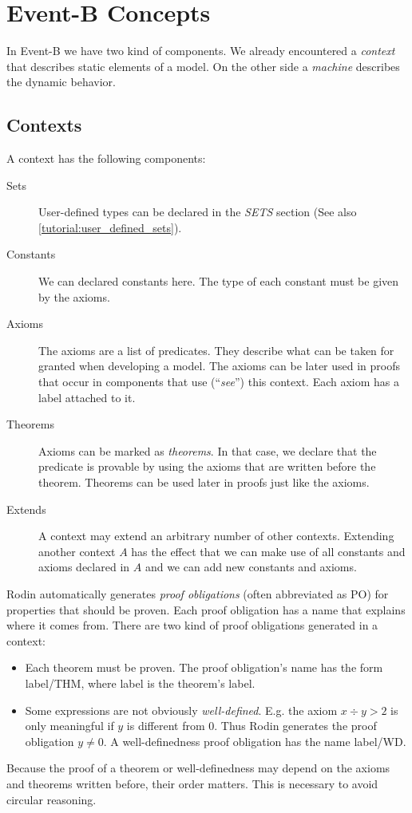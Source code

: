 \newcommand{\eventbpo}[1]{\textsf{#1}}

\section{Event-B Concepts}
\label{tutorial_06}

In Event-B we have two kind of components.
We already encountered a \emph{context} that describes static elements of a model.
On the other side a \emph{machine} describes the dynamic behavior.

\subsection{Contexts}
\label{tutorial:contexts}

A context has the following components:
\begin{description}
\item[Sets]
  User-defined types can be declared in the \textsl{SETS} section
  (See also \ref{tutorial:user_defined_sets}).
\item[Constants]
  We can declared constants here. The type of each constant must be given
  by the axioms.
\item[Axioms] The axioms are a list of predicates. 
  They describe what can be taken for granted when developing a model.
  The axioms can be later used in proofs that occur in components that
  use (``\emph{see}'') this context.
  Each axiom has a label attached to it.
\item[Theorems] 
  Axioms can be marked as \emph{theorems}. In that case, we declare that
  the predicate is provable by using the axioms that are written 
  before the theorem.
  Theorems can be used later in proofs just like the axioms.
\item[Extends]
  A context may extend an arbitrary number of other contexts.
  Extending another context $A$ has the effect that we can make use of
  all constants and axioms declared in $A$ and we can add new constants
  and axioms.
\end{description}
Rodin automatically generates \emph{proof obligations} (often abbreviated as PO) for properties that
should be proven. Each proof obligation has a name that explains where it comes from.
There are two kind of proof obligations generated in a context:
\begin{itemize}
  \item Each theorem must be proven. The proof obligation's name has the form 
    \eventbpo{label/THM}, where \eventbpo{label} is the theorem's label.
  \item Some expressions are not obviously \emph{well-defined}.
    E.g. the axiom $x \div y > 2$ is only meaningful if $y$ is different from 0.
    Thus Rodin generates the proof obligation $y\neq 0$.
    A well-definedness proof obligation has the name \eventbpo{label/WD}.
\end{itemize}
Because the proof of a theorem or well-definedness may depend 
on the axioms and theorems written before, their order matters.
This is necessary to avoid circular reasoning.


